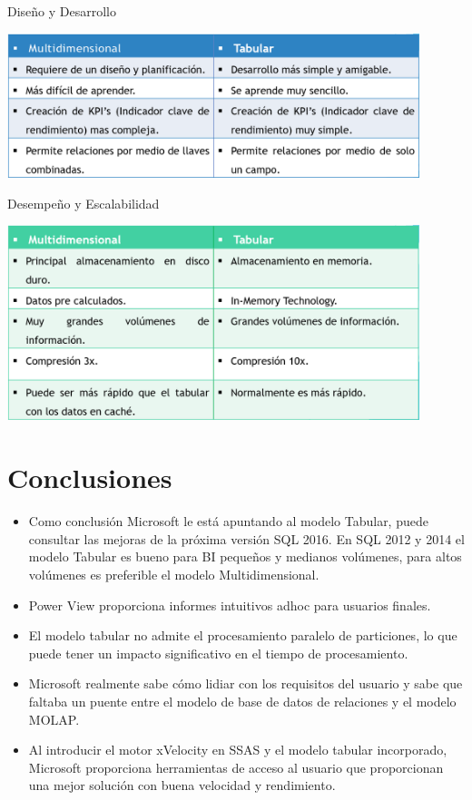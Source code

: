 \documentclass[preprint,12pt]{elsarticle}
\begin{document}
Diseño y Desarrollo\\
\begin{center}
	\includegraphics[width=12cm]{./Imagenes/dif1} 
\end{center}
\pagebreak
Desempeño y Escalabilidad\\
\begin{center}
	\includegraphics[width=12cm]{./Imagenes/dif2} 
\end{center}

\section{Conclusiones}


\begin{itemize}
	\item Como conclusión Microsoft le está apuntando al modelo Tabular, puede consultar las mejoras de la próxima versión SQL 2016. En SQL 2012 y 2014 el modelo Tabular es bueno para BI pequeños y medianos volúmenes, para altos volúmenes es preferible el modelo Multidimensional.
	\item Power View proporciona informes intuitivos adhoc para usuarios finales. 
	\item El modelo tabular no admite el procesamiento paralelo de particiones, lo que puede tener un impacto significativo en el tiempo de procesamiento.
	\item Microsoft realmente sabe cómo lidiar con los requisitos del usuario y sabe que faltaba un puente entre el modelo de base de datos de relaciones y el modelo MOLAP. 
	\item Al introducir el motor xVelocity en SSAS y el modelo tabular incorporado, Microsoft proporciona herramientas de acceso al usuario que proporcionan una mejor solución con buena velocidad y rendimiento. 
\end{itemize}
\end{document}
